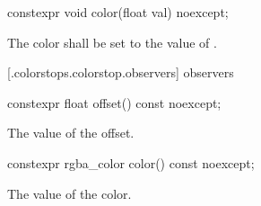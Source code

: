 %
\begin{itemdecl}
constexpr void color(float val) noexcept;
\end{itemdecl}
\begin{itemdescr}
	\pnum
	\effects
	The color shall be set to the value of .
\end{itemdescr}

 [\iotwod.colorstops.colorstop.observers]{ observers}

\begin{itemdecl}
	constexpr float offset() const noexcept;
\end{itemdecl}
\begin{itemdescr}
	\pnum
	\returns
	The value of the offset.
\end{itemdescr}

\begin{itemdecl}
	constexpr rgba_color color() const noexcept;
\end{itemdecl}
\begin{itemdescr}
	\pnum
	\returns
	The value of the color.
\end{itemdescr}
